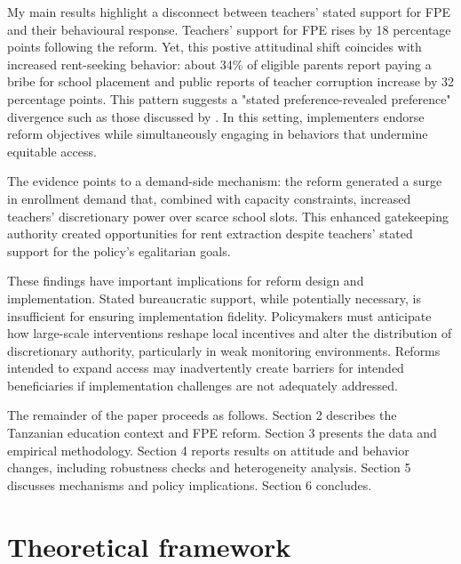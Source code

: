 \documentclass[hidelinks,12pt]{article}
\begin{document}
\begin{singlespace}
My main results highlight a disconnect between teachers’ stated support for FPE and their behavioural response. Teachers’ support for FPE rises by 18 percentage points following the reform. Yet, this postive attitudinal shift coincides with increased rent-seeking behavior: about 34\% of eligible parents report paying a bribe for school placement and public reports of teacher corruption increase by 32 percentage points. This pattern suggests a "stated preference-revealed preference" divergence such as those discussed by \textcite{beshears_how_2008}. In this setting, implementers endorse reform objectives while simultaneously engaging in behaviors that undermine equitable access.

The evidence points to a demand-side mechanism: the reform generated a surge in enrollment demand that, combined with capacity constraints, increased teachers' discretionary power over scarce school slots. This enhanced gatekeeping authority created opportunities for rent extraction despite teachers' stated support for the policy's egalitarian goals.

These findings have important implications for reform design and implementation. Stated bureaucratic support, while potentially necessary, is insufficient for ensuring implementation fidelity. Policymakers must anticipate how large-scale interventions reshape local incentives and alter the distribution of discretionary authority, particularly in weak monitoring environments. Reforms intended to expand access may inadvertently create barriers for intended beneficiaries if implementation challenges are not adequately addressed.

The remainder of the paper proceeds as follows. Section 2 describes the Tanzanian education context and FPE reform. Section 3 presents the data and empirical methodology. Section 4 reports results on attitude and behavior changes, including robustness checks and heterogeneity analysis. Section 5 discusses mechanisms and policy implications. Section 6 concludes.



\section{Theoretical framework}\label{sec:theory}


\end{singlespace}
\end{document}
